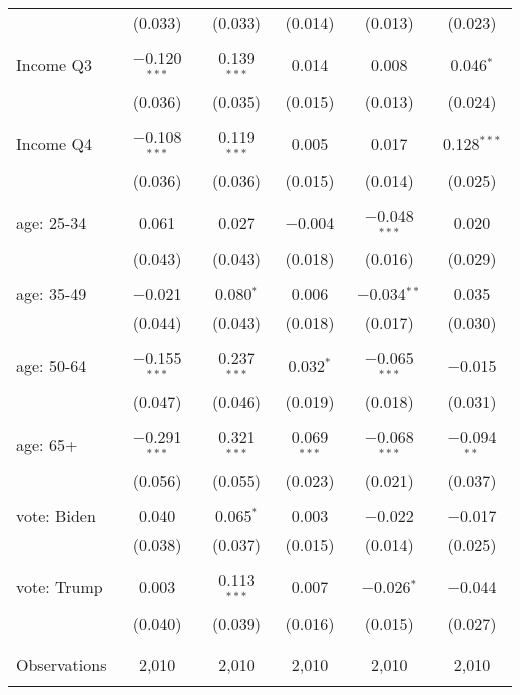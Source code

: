 \begin{tabular}{@{\extracolsep{5pt}}lccccc}
  & (0.033) & (0.033) & (0.014) & (0.013) & (0.023) \\ 
  & & & & & \\ 
 Income Q3 & $-$0.120$^{***}$ & 0.139$^{***}$ & 0.014 & 0.008 & 0.046$^{*}$ \\ 
  & (0.036) & (0.035) & (0.015) & (0.013) & (0.024) \\ 
  & & & & & \\ 
 Income Q4 & $-$0.108$^{***}$ & 0.119$^{***}$ & 0.005 & 0.017 & 0.128$^{***}$ \\ 
  & (0.036) & (0.036) & (0.015) & (0.014) & (0.025) \\ 
  & & & & & \\ 
 age: 25-34 & 0.061 & 0.027 & $-$0.004 & $-$0.048$^{***}$ & 0.020 \\ 
  & (0.043) & (0.043) & (0.018) & (0.016) & (0.029) \\ 
  & & & & & \\ 
 age: 35-49 & $-$0.021 & 0.080$^{*}$ & 0.006 & $-$0.034$^{**}$ & 0.035 \\ 
  & (0.044) & (0.043) & (0.018) & (0.017) & (0.030) \\ 
  & & & & & \\ 
 age: 50-64 & $-$0.155$^{***}$ & 0.237$^{***}$ & 0.032$^{*}$ & $-$0.065$^{***}$ & $-$0.015 \\ 
  & (0.047) & (0.046) & (0.019) & (0.018) & (0.031) \\ 
  & & & & & \\ 
 age: 65+ & $-$0.291$^{***}$ & 0.321$^{***}$ & 0.069$^{***}$ & $-$0.068$^{***}$ & $-$0.094$^{**}$ \\ 
  & (0.056) & (0.055) & (0.023) & (0.021) & (0.037) \\ 
  & & & & & \\ 
 vote: Biden & 0.040 & 0.065$^{*}$ & 0.003 & $-$0.022 & $-$0.017 \\ 
  & (0.038) & (0.037) & (0.015) & (0.014) & (0.025) \\ 
  & & & & & \\ 
 vote: Trump & 0.003 & 0.113$^{***}$ & 0.007 & $-$0.026$^{*}$ & $-$0.044 \\ 
  & (0.040) & (0.039) & (0.016) & (0.015) & (0.027) \\ 
  & & & & & \\ 
\hline \\[-1.8ex] 

Observations & 2,010 & 2,010 & 2,010 & 2,010 & 2,010 \\ 
\hline 
\hline \\[-1.8ex] 
\end{tabular} 